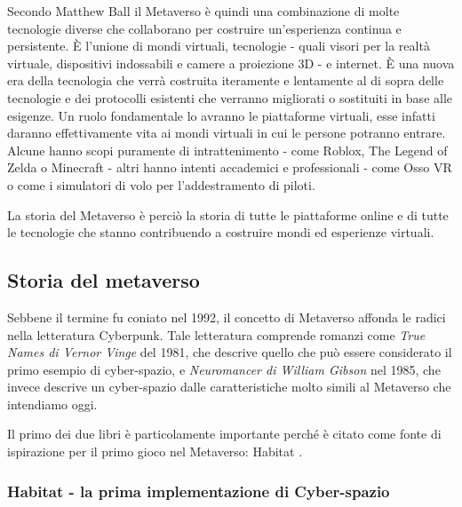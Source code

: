     Secondo Matthew Ball il Metaverso è quindi una combinazione di molte tecnologie diverse che collaborano per costruire un'esperienza continua e persistente.
    È l'unione di mondi virtuali, tecnologie - quali visori per la realtà virtuale, dispositivi indossabili e camere a proiezione 3D - e internet.
    È una nuova era della tecnologia che verrà costruita iteramente e lentamente al di sopra delle tecnologie e dei protocolli esistenti che verranno migliorati o sostituiti in base alle esigenze.
    Un ruolo fondamentale lo avranno le piattaforme virtuali, esse infatti daranno effettivamente vita ai mondi virtuali in cui le persone potranno entrare.
    Alcune hanno scopi puramente di intrattenimento - come Roblox, The Legend of Zelda o Minecraft - altri hanno intenti accademici e professionali - come Osso VR o come i simulatori di volo per l'addestramento di piloti.

    La storia del Metaverso è perciò la storia di tutte le piattaforme online e di tutte le tecnologie che stanno contribuendo a costruire mondi ed esperienze virtuali.

    \subsection{Storia del metaverso}
    Sebbene il termine fu coniato nel 1992, il concetto di Metaverso affonda le radici nella letteratura Cyberpunk.
    Tale letteratura comprende romanzi come \textit{True Names di Vernor Vinge} del 1981, che descrive quello che può essere considerato il primo esempio di cyber-spazio, e \textit{Neuromancer di William Gibson} nel 1985, che invece descrive un cyber-spazio dalle caratteristiche molto simili al Metaverso che intendiamo oggi.

    Il primo dei due libri è particolamente importante perché è citato come fonte di ispirazione per il primo gioco nel Metaverso: Habitat \cite{Habitat1990}.

        \subsubsection{Habitat - la prima implementazione di Cyber-spazio}

